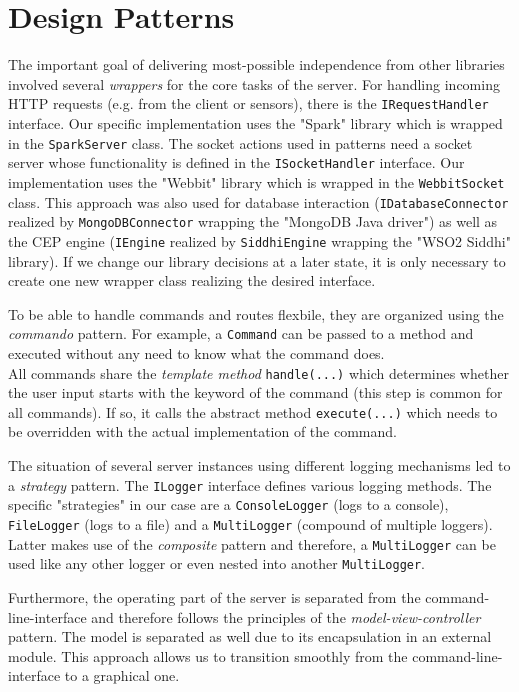 \section{Design Patterns}
The important goal of delivering most-possible independence from other libraries
involved several \emph{wrappers} for the core tasks of the server.
For handling incoming HTTP requests (e.g. from the client or sensors), there is
the \texttt{IRequestHandler} interface. Our specific implementation uses
the "Spark" library which is wrapped in the \texttt{SparkServer} class.
The socket actions used in patterns need a socket server whose functionality is
defined in the \texttt{ISocketHandler} interface. Our implementation uses the
"Webbit" library which is wrapped in the \texttt{WebbitSocket} class.
This approach was also used for database interaction (\texttt{IDatabaseConnector}
realized by \texttt{MongoDBConnector} wrapping the "MongoDB Java driver") as well as
the CEP engine (\texttt{IEngine} realized by \texttt{SiddhiEngine} wrapping the
"WSO2 Siddhi" library). If we change our library decisions at a later state,
it is only necessary to create one new wrapper class realizing the desired interface.

To be able to handle commands and routes flexbile, they are organized using
the \emph{commando} pattern. For example, a \texttt{Command} can be passed to a
method and executed without any need to know what the command does. \\
All commands share the \emph{template method} \texttt{handle(...)} which
determines whether the user input starts with the keyword of the command
(this step is common for all commands). If so, it calls the abstract method
\texttt{execute(...)} which needs to be overridden with the actual implementation
of the command.

The situation of several server instances using different logging mechanisms
led to a \emph{strategy} pattern. The \texttt{ILogger} interface defines
various logging methods. The specific "strategies" in our case are a
\texttt{ConsoleLogger} (logs to a console), \texttt{FileLogger} (logs to a file)
and a \texttt{MultiLogger} (compound of multiple loggers). Latter makes use
of the \emph{composite} pattern and therefore, a \texttt{MultiLogger} can be used
like any other logger or even nested into another \texttt{MultiLogger}.

Furthermore, the operating part of the server is separated from the command-line-interface
and therefore follows the principles of the \emph{model-view-controller} pattern.
The model is separated as well due to its encapsulation in an external module.
This approach allows us to transition smoothly from the command-line-interface
to a graphical one.


